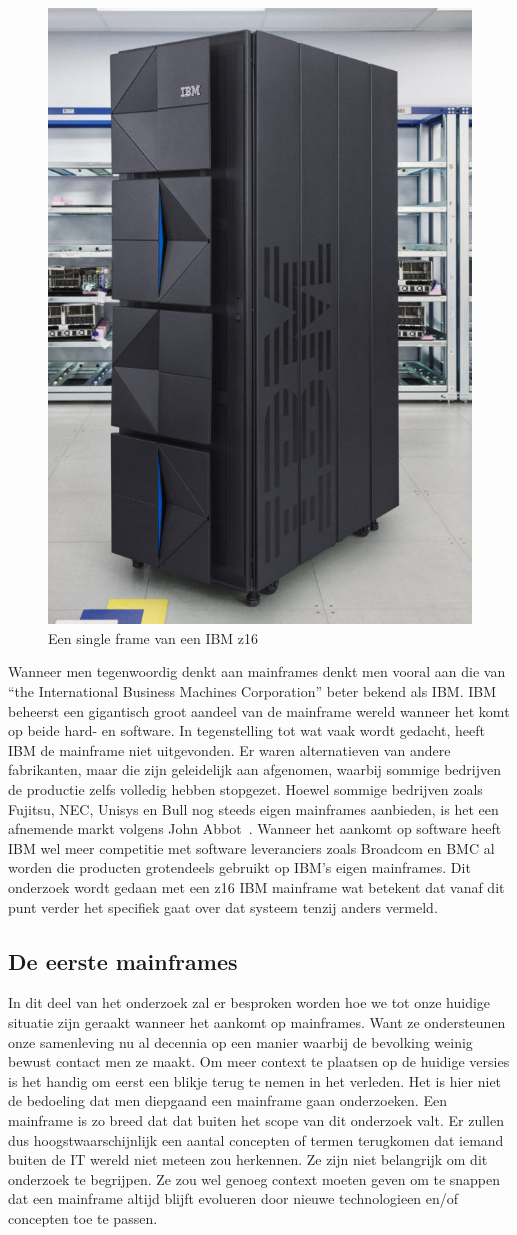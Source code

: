 \begin{figure}[h]
    \centering
    \includegraphics[width=0.40\linewidth]{bachproef//graphics/Singe_Frame_Mainframe_z16.jpg}
    \caption{Een single frame van een IBM z16 ~\autocite{Tech2023}}
    \label{fig:Een single frame van een IBM z16}
\end{figure}


Wanneer men tegenwoordig denkt aan mainframes denkt men vooral aan die van “the International Business Machines Corporation” beter bekend als IBM. IBM beheerst een gigantisch groot aandeel van de mainframe wereld wanneer het komt op beide hard- en software. In tegenstelling tot wat vaak wordt gedacht, heeft IBM de mainframe niet uitgevonden. Er waren alternatieven van andere fabrikanten, maar die zijn geleidelijk aan afgenomen, waarbij sommige bedrijven de productie zelfs volledig hebben stopgezet. Hoewel sommige bedrijven zoals Fujitsu, NEC, Unisys en Bull nog steeds eigen mainframes aanbieden, is het een afnemende markt volgens John Abbot~\autocite{DrewRobb}. Wanneer het aankomt op software heeft IBM wel meer competitie met software leveranciers zoals Broadcom en BMC al worden die producten grotendeels gebruikt op IBM’s eigen mainframes. Dit onderzoek wordt gedaan met een z16 IBM mainframe wat betekent dat vanaf dit punt verder het specifiek gaat over dat systeem tenzij anders vermeld.

\subsection{De eerste mainframes}
In dit deel van het onderzoek zal er besproken worden hoe we tot onze huidige situatie zijn geraakt wanneer het aankomt op mainframes. Want ze ondersteunen onze samenleving nu al decennia op een manier waarbij de bevolking weinig bewust contact men ze maakt. Om meer context te plaatsen op de huidige versies is het handig om eerst een blikje terug te nemen in het verleden. Het is hier niet de bedoeling dat men diepgaand een mainframe gaan onderzoeken. Een mainframe is zo breed dat dat buiten het scope van dit onderzoek valt. Er zullen dus hoogstwaarschijnlijk een aantal concepten of termen terugkomen dat iemand buiten de IT wereld niet meteen zou herkennen. Ze zijn niet belangrijk om dit onderzoek te begrijpen. Ze zou wel genoeg context moeten geven om te snappen dat een mainframe altijd blijft evolueren door nieuwe technologieen en/of concepten toe te passen. 

